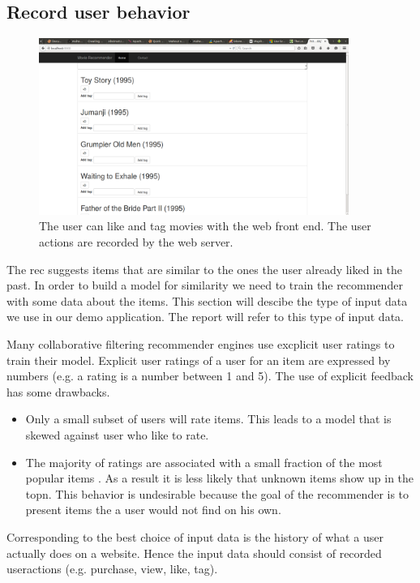 \subsection{Record user behavior}
\label{sec:inputdata}

\begin{figure}
  \centering
     \includegraphics[width=0.9\textwidth]{collectinginput}
  \caption{The user can like and tag movies with the web front end. The user actions are recorded by the web server.}
  \label{fig:gui}
\end{figure}

The \gls{rec} suggests items that are similar to the ones the user already liked in the past. In order to build a model for similarity we need to train the recommender with some data about the items.
This section will descibe the type of input data we use  in our demo application. The report will refer to this type of input data. 

Many collaborative filtering recommender engines use excplicit user ratings to train their model. Explicit user ratings of a user for an item are expressed by numbers (e.g. a rating is a number between 1 and 5). The use of explicit feedback has some drawbacks.
\begin{itemize}
\item Only a small subset of users will rate items. This leads to a model that is skewed against user who like to rate.
\item The majority of ratings are associated with a small fraction of the most popular items \cite{Anderson}. As a result it is less likely that unknown items show up in the \gls{topn}. This behavior is undesirable because the goal of the recommender is to present items the a user would not find on his own.
\end{itemize}


Corresponding to \cite{Dunning14} the best choice of input data is the history of what a user actually does on a website. Hence the input data should consist of recorded \glspl{useraction} (e.g. purchase, view, like, tag).

